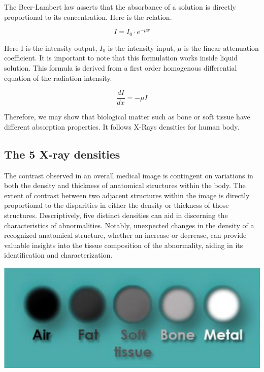 \documentclass[a4paper,12pt]{report}
\begin{document}
The Beer-Lambert law asserts that the absorbance of a solution is directly proportional to its
concentration. Here is the relation.

\begin{equation}
  I = I_0 \cdot e^{- \mu x}
\end{equation}

Here I is the intensity output, \(I_0\) is the intensity input, \(\mu\) is the linear attenuation coefficient.
It is important to note that this formulation works inside liquid solution.
This formula is derived from a first order homogenous differential equation of the radiation
intensity.

\begin{equation}
  \frac{dI}{dx} = - \mu I
\end{equation}

Therefore, we may show that biological matter such as bone or soft tissue have different absorption properties. It follows X-Rays densities for human body.

\subsection{The 5 X-ray densities}
The contrast observed in an overall medical image is contingent on variations in both the density
and thickness of anatomical structures within the body. The extent of contrast between two
adjacent structures within the image is directly proportional to the disparities in either the density
or thickness of those structures. Descriptively, five distinct densities can aid in discerning the
characteristics of abnormalities. Notably, unexpected changes in the density of a recognized
anatomical structure, whether an increase or decrease, can provide valuable insights into the
tissue composition of the abnormality, aiding in its identification and characterization.

\begin{center}
  \includegraphics[scale = 1.2]{xraydensity.png}
  \label{5densities}
\end{center}
\end{document}
